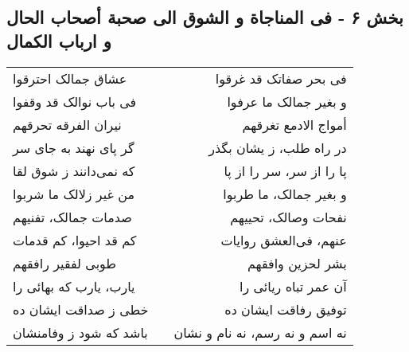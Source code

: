\begin{center}
\section*{بخش ۶ - فی المناجاة و الشوق الی صحبة أصحاب الحال و ارباب الکمال}
\label{sec:006}
\begin{longtable}{l p{0.5cm} r}
عشاق جمالک احترقوا
&&
فی بحر صفاتک قد غرقوا
\\
فی باب نوالک قد وقفوا
&&
و بغیر جمالک ما عرفوا
\\
نیران الفرقه تحرقهم
&&
أمواج الادمع تغرقهم
\\
گر پای نهند به جای سر
&&
در راه طلب، ز یشان بگذر
\\
که نمی‌دانند ز شوق لقا
&&
پا را از سر، سر را از پا
\\
من غیر زلالک ما شربوا
&&
و بغیر جمالک، ما طربوا
\\
صدمات جمالک، تفنیهم
&&
نفحات وصالک، تحییهم
\\
کم قد احیوا، کم قدمات
&&
عنهم، فی‌العشق روایات
\\
طوبی لفقیر رافقهم
&&
بشر لحزین وافقهم
\\
یارب، یارب که بهائی را
&&
آن عمر تباه ریائی را
\\
خطی ز صداقت ایشان ده
&&
توفیق رفاقت ایشان ده
\\
باشد که شود ز وفامنشان
&&
نه اسم و نه رسم، نه نام و نشان
\\
\end{longtable}
\end{center}
